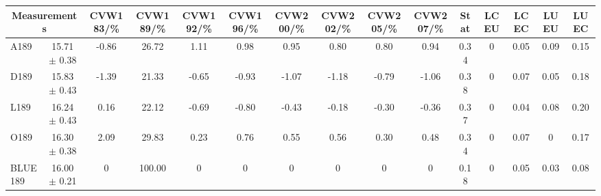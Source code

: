 \begin{table}[H]
\scriptsize
\begin{center}
\renewcommand{\arraystretch}{1.1}
\begin{tabular}{|lc|c|c|c|c|c|c|c|c|ccccc|}
\hline
\multicolumn{2}{|c|}{Measurements} & CVW{\tiny 183}/\%  & CVW{\tiny 189}/\%  & CVW{\tiny 192}/\%  & CVW{\tiny 196}/\%  & CVW{\tiny 200}/\%  & CVW{\tiny 202}/\%  & CVW{\tiny 205}/\%  & CVW{\tiny 207}/\%  & {\tiny Stat} & {\tiny LCEU} & {\tiny LCEC} & {\tiny LUEU} & {\tiny LUEC}\\
\hline
A189 &      15.71 $\pm$       0.38 &      -0.86 &      26.72 &       1.11 &       0.98 &       0.95 &       0.80 &       0.80 &       0.94 &       0.34 &  0 &       0.05 &       0.09 &       0.15\\
D189 &      15.83 $\pm$       0.43 &      -1.39 &      21.33 &      -0.65 &      -0.93 &      -1.07 &      -1.18 &      -0.79 &      -1.06 &       0.38 &  0 &       0.07 &       0.05 &       0.18\\
L189 &      16.24 $\pm$       0.43 &       0.16 &      22.12 &      -0.69 &      -0.80 &      -0.43 &      -0.18 &      -0.30 &      -0.36 &       0.37 &  0 &       0.04 &       0.08 &       0.20\\
O189 &      16.30 $\pm$       0.38 &       2.09 &      29.83 &       0.23 &       0.76 &       0.55 &       0.56 &       0.30 &       0.48 &       0.34 &  0 &       0.07 &  0 &       0.17\\
\hline
BLUE {\tiny 189} &      16.00 $\pm$       0.21 &  0 &     100.00 &  0 &  0 &  0 &  0 &  0 &  0 &       0.18 &  0 &       0.05 &       0.03 &       0.08\\
\hline
\end{tabular}
\renewcommand{\arraystretch}{1}
\end{center}
\end{table}
\vspace*{-0.5cm}
